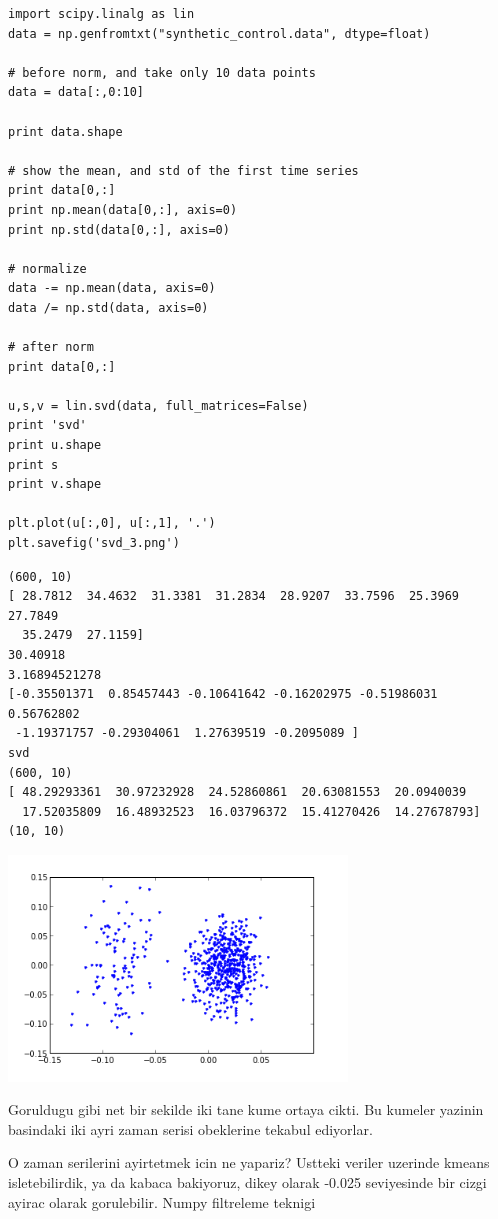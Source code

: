 \documentclass[12pt,fleqn]{article}\usepackage{../common}
\begin{document}
\begin{verbatim}
import scipy.linalg as lin
data = np.genfromtxt("synthetic_control.data", dtype=float)

# before norm, and take only 10 data points
data = data[:,0:10]

print data.shape

# show the mean, and std of the first time series
print data[0,:]
print np.mean(data[0,:], axis=0)
print np.std(data[0,:], axis=0)

# normalize
data -= np.mean(data, axis=0)
data /= np.std(data, axis=0)

# after norm
print data[0,:]

u,s,v = lin.svd(data, full_matrices=False)
print 'svd'
print u.shape
print s
print v.shape

plt.plot(u[:,0], u[:,1], '.')
plt.savefig('svd_3.png')
\end{verbatim}

\begin{verbatim}
(600, 10)
[ 28.7812  34.4632  31.3381  31.2834  28.9207  33.7596  25.3969  27.7849
  35.2479  27.1159]
30.40918
3.16894521278
[-0.35501371  0.85457443 -0.10641642 -0.16202975 -0.51986031  0.56762802
 -1.19371757 -0.29304061  1.27639519 -0.2095089 ]
svd
(600, 10)
[ 48.29293361  30.97232928  24.52860861  20.63081553  20.0940039
  17.52035809  16.48932523  16.03796372  15.41270426  14.27678793]
(10, 10)
\end{verbatim}

\includegraphics[height=6cm]{svd_3.png}

Goruldugu gibi net bir sekilde iki tane kume ortaya cikti. Bu kumeler
yazinin basindaki iki ayri zaman serisi obeklerine tekabul ediyorlar. 

O zaman serilerini ayirtetmek icin ne yapariz? Ustteki veriler uzerinde
kmeans isletebilirdik, ya da kabaca bakiyoruz, dikey olarak -0.025
seviyesinde bir cizgi ayirac olarak gorulebilir. Numpy filtreleme teknigi
\end{document}
